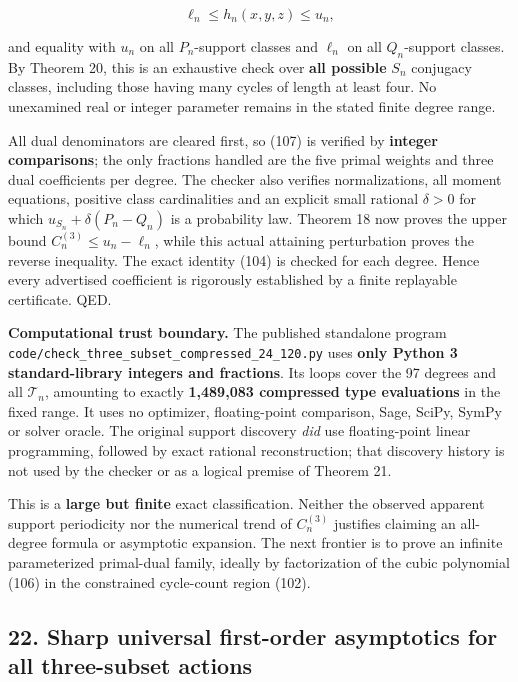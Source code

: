 \documentclass[
  11pt,
]{article}
\begin{document}
\[
\ell_n\le h_n(x,y,z)\le u_n, \tag{107}
\]

and equality with \(u_n\) on all \(P_n\)-support classes and \(\ell_n\)
on all \(Q_n\)-support classes. By Theorem 20, this is an exhaustive
check over \textbf{all possible} \(S_n\) conjugacy classes, including
those having many cycles of length at least four. No unexamined real or
integer parameter remains in the stated finite degree range.

All dual denominators are cleared first, so (107) is verified by
\textbf{integer comparisons}; the only fractions handled are the five
primal weights and three dual coefficients per degree. The checker also
verifies normalizations, all moment equations, positive class
cardinalities and an explicit small rational \(\delta>0\) for which
\(u_{S_n}+\delta(P_n-Q_n)\) is a probability law. Theorem 18 now proves
the upper bound \(C_n^{(3)}\le u_n-\ell_n\), while this actual attaining
perturbation proves the reverse inequality. The exact identity (104) is
checked for each degree. Hence every advertised coefficient is
rigorously established by a finite replayable certificate. QED.

\textbf{Computational trust boundary.} The published standalone program
\nolinkurl{code/check_three_subset_compressed_24_120.py} uses
\textbf{only Python 3 standard-library integers and fractions}. Its
loops cover the 97 degrees and all \(\mathcal T_n\), amounting to
exactly \textbf{1,489,083 compressed type evaluations} in the fixed
range. It uses no optimizer, floating-point comparison, Sage, SciPy,
SymPy or solver oracle. The original support discovery \emph{did} use
floating-point linear programming, followed by exact rational
reconstruction; that discovery history is not used by the checker or as
a logical premise of Theorem 21.

This is a \textbf{large but finite} exact classification. Neither the
observed apparent support periodicity nor the numerical trend of
\(C_n^{(3)}\) justifies claiming an all-degree formula or asymptotic
expansion. The next frontier is to prove an infinite parameterized
primal-dual family, ideally by factorization of the cubic polynomial
(106) in the constrained cycle-count region (102).

\subsection{22. Sharp universal first-order asymptotics for all
three-subset
actions}\label{sharp-universal-first-order-asymptotics-for-all-three-subset-actions}
\end{document}
